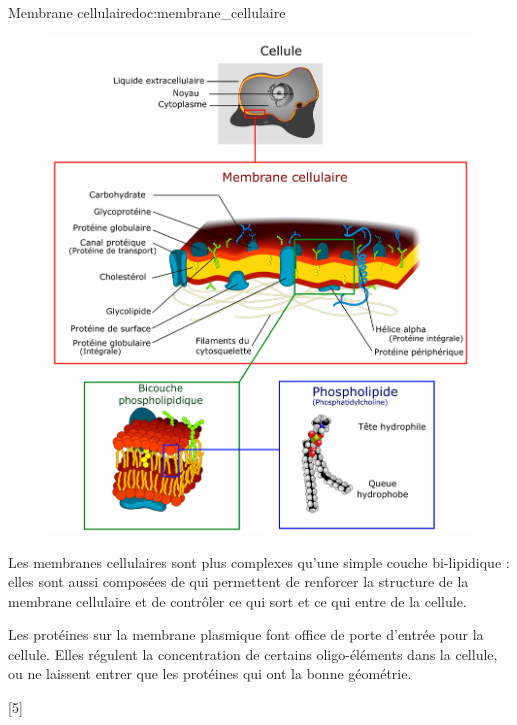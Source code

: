 \begin{doc}{Membrane cellulaire}{doc:membrane_cellulaire}
  \begin{figure}
    \centering
    \vspace*{-36pt}
    \includegraphics[width=0.9\linewidth]{images/cellule_membrane_lipide.png}
  \end{figure}
  Les membranes cellulaires sont plus complexes qu'une simple couche bi-lipidique : elles sont aussi composées de  qui permettent de renforcer la structure de la membrane cellulaire et de contrôler ce qui sort et ce qui entre de la cellule.
  \bigskip

  Les protéines sur la membrane plasmique font office de porte d'entrée pour la cellule. 
  Elles régulent la concentration de certains oligo-éléments dans la cellule, ou ne laissent entrer que les protéines qui ont la bonne géométrie.

  \vspace{2.2cm}
  \phantom{b}

\end{doc}

[5]
